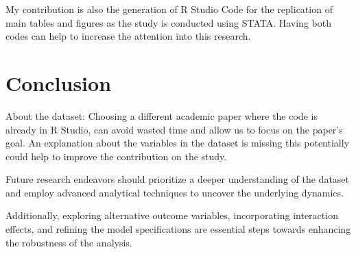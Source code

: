\documentclass[12pt,letterpaper]{article}
\begin{document}
My contribution is also the generation of R Studio Code for the replication of main tables and figures as the study is conducted using STATA. Having both codes can help to increase the attention into this research. 


\section*{Conclusion}
About the dataset: 
Choosing a different academic paper where the code is already in R Studio, can avoid wasted time and allow us to focus on the paper's goal.
An explanation about the variables in the dataset is missing this potentially could help to improve the contribution on the study. 

Future research endeavors should prioritize a deeper understanding of the dataset and employ advanced analytical techniques to uncover the underlying dynamics.

Additionally, exploring alternative outcome variables, incorporating interaction effects, and refining the model specifications are essential steps towards enhancing the robustness of the analysis.
\end{document}
